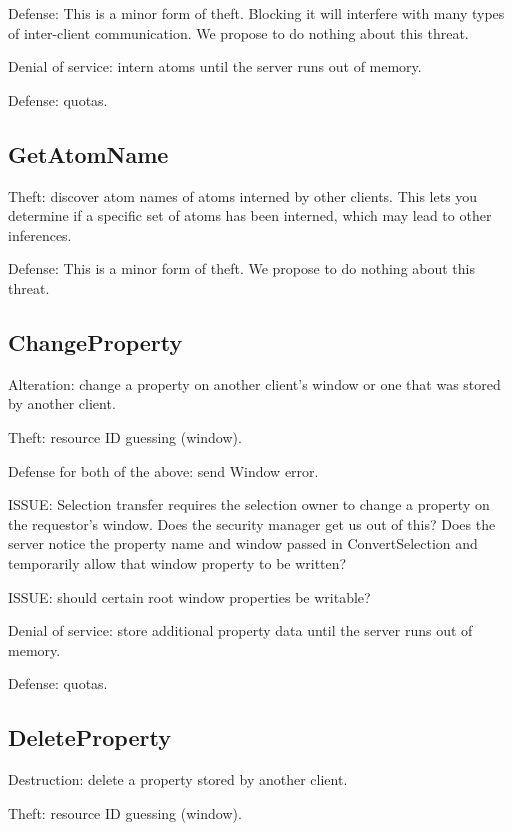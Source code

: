 \documentclass{article}
\begin{document}
Defense: This is a minor form of theft.  Blocking it will interfere
with many types of inter-client communication.  We propose to do
nothing about this threat.

Denial of service: intern atoms until the server runs out of memory.

Defense: quotas.



\subsection{GetAtomName}

Theft: discover atom names of atoms interned by other clients.
This lets you determine if a specific set of atoms has been
interned, which may lead to other inferences.

Defense: This is a minor form of theft.  We propose to do nothing
about this threat.



\subsection{ChangeProperty}

Alteration: change a property on another client's window or one that
was stored by another client.

Theft: resource ID guessing (window).

Defense for both of the above: send Window error.

ISSUE: Selection transfer requires the selection owner to change a
property on the requestor's window.  Does the security manager get us
out of this?  Does the server notice the property name and window
passed in ConvertSelection and temporarily allow that window property
to be written?

ISSUE: should certain root window properties be writable?

Denial of service: store additional property data until the server
runs out of memory.

Defense: quotas.



\subsection{DeleteProperty}

Destruction: delete a property stored by another client.

Theft: resource ID guessing (window).
\end{document}
